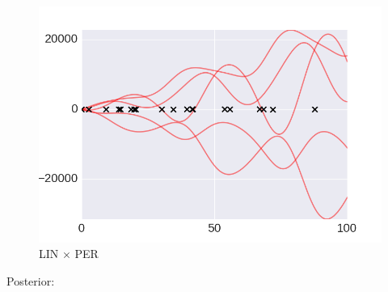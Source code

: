     \begin{subfigure}[b]{0.3\textwidth}
        \includegraphics[width=\textwidth]{figs/composition/composition_demo_LINxPER_prior.png}
        \caption{LIN $\times$ PER}
    \end{subfigure} \vspace{4mm} 

Posterior:

